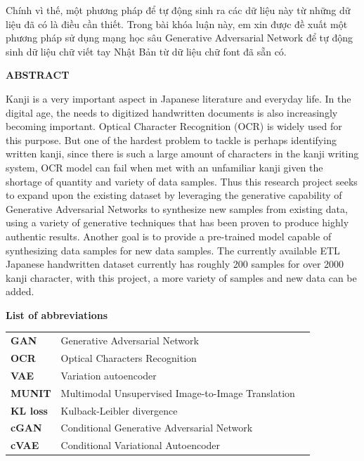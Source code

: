 \documentclass[12pt]{report}
\begin{document}
Chính vì thế, một phương pháp để tự động sinh ra các dữ liệu này từ những dữ liệu đã có là điều cần thiết. Trong bài khóa luận này, em xin được đề xuất một phương pháp sử dụng mạng học sâu Generative Adversarial Network để tự động sinh dữ liệu chữ viết tay Nhật Bản từ dữ liệu chữ font đã sẵn có.

\newpage
\begin{center}
	\textbf{\large ABSTRACT}
\end{center}
Kanji is a very important aspect in Japanese literature and everyday life. In the digital age, the needs to digitized handwritten documents is also increasingly becoming important. Optical Character Recognition (OCR) is widely used for this purpose. But one of the hardest problem to tackle is perhaps identifying written kanji, since there is such a large amount of characters in the kanji writing system, OCR model can fail when met with an unfamiliar kanji given the shortage of quantity and variety of data samples. Thus this research project seeks to expand upon the existing dataset by leveraging the generative capability of Generative Adversarial Networks to synthesize new samples from existing data, using a variety of generative techniques that has been proven to produce highly authentic results. Another goal is to provide a pre-trained model capable of synthesizing data samples for new data samples.
The currently available ETL Japanese handwritten dataset \cite{etl} currently has roughly 200 samples for over 2000 kanji character, with this project, a more variety of samples and new data can be added.

\newpage
\tableofcontents

\newpage
{}
\listoftables

\newpage
{}
\begin{flushleft}
\bfseries{\Huge{List of abbreviations}}
\end{flushleft}
\begin{table}[h]
	\centering
	\begin{tabular}{lll}
		\textbf{GAN}  & Generative Adversarial Network\\[0.3cm]
		\textbf{OCR}  & Optical Characters Recognition              \\[0.3cm]
		\textbf{VAE} & Variation autoencoder \\[0.3cm]
		\textbf{MUNIT} & Multimodal Unsupervised Image-to-Image Translation \\[0.3cm]	
		\textbf{KL loss} & Kulback-Leibler divergence \\[0.3cm]
		\textbf{cGAN} & Conditional Generative Adversarial Network \\[0.3cm]
		\textbf{cVAE} & Conditional Variational Autoencoder \\[0.3cm]
	\end{tabular}
\end{table}
\end{document}
